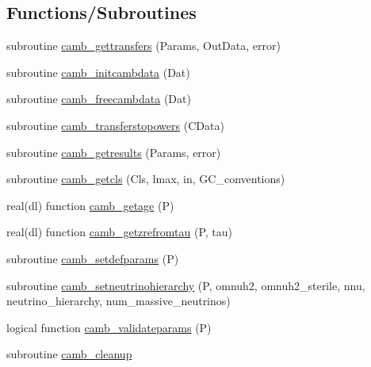 \subsection*{Functions/\+Subroutines}
\begin{DoxyCompactItemize}
\item 
subroutine \mbox{\hyperlink{namespacecamb_ae587b573e03da5811edb59806305b2cd}{camb\+\_\+gettransfers}} (Params, Out\+Data, error)
\item 
subroutine \mbox{\hyperlink{namespacecamb_a64195b97e1e4c42b990076ff2bff6f1d}{camb\+\_\+initcambdata}} (Dat)
\item 
subroutine \mbox{\hyperlink{namespacecamb_a20b57e6f6098c5800cbf374d96307d13}{camb\+\_\+freecambdata}} (Dat)
\item 
subroutine \mbox{\hyperlink{namespacecamb_a9fb2095034057d44dc9526dd02d60064}{camb\+\_\+transferstopowers}} (C\+Data)
\item 
subroutine \mbox{\hyperlink{namespacecamb_af6f4c73133d3de79ac10db3c4b2d0650}{camb\+\_\+getresults}} (Params, error)
\item 
subroutine \mbox{\hyperlink{namespacecamb_abeb0ae530a720a17a76108dbed29c1fc}{camb\+\_\+getcls}} (Cls, lmax, in, G\+C\+\_\+conventions)
\item 
real(dl) function \mbox{\hyperlink{namespacecamb_a53e4d3ff396030bd7e41d606cfa458b2}{camb\+\_\+getage}} (P)
\item 
real(dl) function \mbox{\hyperlink{namespacecamb_ab45910129412993d163c3d4b83e19152}{camb\+\_\+getzrefromtau}} (P, tau)
\item 
subroutine \mbox{\hyperlink{namespacecamb_a6ce30ab6419006324d56d3e4434530f9}{camb\+\_\+setdefparams}} (P)
\item 
subroutine \mbox{\hyperlink{namespacecamb_ad303911c183f5affcdc9665c5facdd4b}{camb\+\_\+setneutrinohierarchy}} (P, omnuh2, omnuh2\+\_\+sterile, nnu, neutrino\+\_\+hierarchy, num\+\_\+massive\+\_\+neutrinos)
\item 
logical function \mbox{\hyperlink{namespacecamb_ae9577b86a4f0803e5754a23871a7113e}{camb\+\_\+validateparams}} (P)
\item 
subroutine \mbox{\hyperlink{namespacecamb_a70f3206a0056ea3ff96defbc4d2be548}{camb\+\_\+cleanup}}
\end{DoxyCompactItemize}
